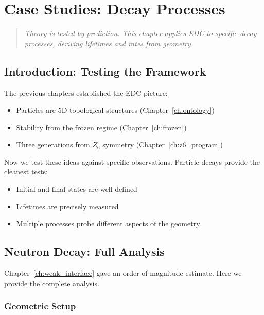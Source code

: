 \chapter{Case Studies: Decay Processes}
\label{ch:case_studies}

\begin{quote}
\textit{Theory is tested by prediction. This chapter applies EDC
to specific decay processes, deriving lifetimes and rates from geometry.}
\end{quote}

\section{Introduction: Testing the Framework}
\label{sec:case_intro}

The previous chapters established the EDC picture:
\begin{itemize}[nosep]
\item Particles are 5D topological structures (Chapter~\ref{ch:ontology})
\item Stability from the frozen regime (Chapter~\ref{ch:frozen})
\item Three generations from $Z_6$ symmetry (Chapter~\ref{ch:z6_program})
\end{itemize}

Now we test these ideas against specific observations. Particle decays
provide the cleanest tests:
\begin{itemize}[nosep]
\item Initial and final states are well-defined
\item Lifetimes are precisely measured
\item Multiple processes probe different aspects of the geometry
\end{itemize}

\section{Neutron Decay: Full Analysis}
\label{sec:neutron_full}

Chapter~\ref{ch:weak_interface} gave an order-of-magnitude estimate.
Here we provide the complete analysis.

\subsection{Geometric Setup}

